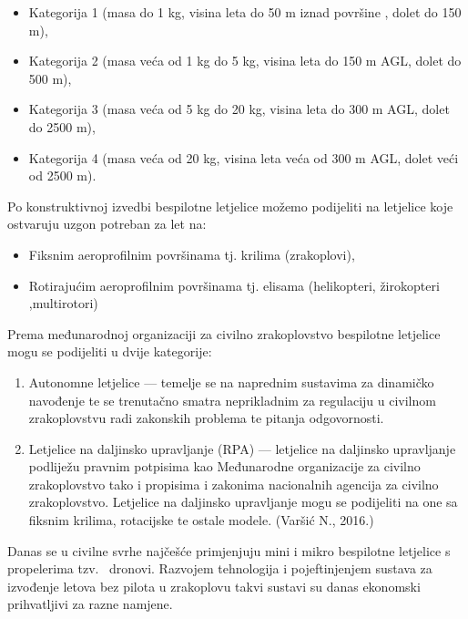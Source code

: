 \documentclass[times, utf8, diplomski]{fer}
\begin{document}
{\begin{itemize}
\item Kategorija  1  (masa  do  1  kg,  visina  leta do 50 m iznad površine , dolet do 150 m),
\item Kategorija 2 (masa veća od 1 kg do 5 kg, visina leta do 150 m AGL, dolet do 500 m),
\item Kategorija 3 (masa veća od 5 kg do 20 kg, visina leta do 300 m AGL, dolet do 2500 m),
\item Kategorija 4 (masa veća od 20 kg, visina leta veća od 300 m AGL, dolet veći od 2500 m).
\end{itemize}
Po konstruktivnoj izvedbi bespilotne letjelice možemo podijeliti na letjelice koje ostvaruju uzgon potreban za let na:\begin{itemize}
\item Fiksnim aeroprofilnim površinama tj. krilima (zrakoplovi),
\item Rotirajućim  aeroprofilnim  površinama  tj.  elisama  (helikopteri,  žirokopteri ,multirotori) 
\end{itemize}
Prema  međunarodnoj  organizaciji  za civilno  zrakoplovstvo   bespilotne letjelice mogu se podijeliti u dvije kategorije:\begin{enumerate}
\item Autonomne letjelice --- temelje se na naprednim sustavima za dinamičko navođenje te se trenutačno smatra neprikladnim za regulaciju u civilnom zrakoplovstvu radi zakonskih problema te pitanja odgovornosti.
\item Letjelice na daljinsko upravljanje (RPA) --- letjelice na daljinsko upravljanje podliježu pravnim  potpisima  kao  Međunarodne organizacije  za  civilno  zrakoplovstvo  tako  i propisima  i  zakonima  nacionalnih  agencija  za  civilno  zrakoplovstvo.  Letjelice  na daljinsko upravljanje mogu se podijeliti na one sa fiksnim krilima, rotacijske te ostale modele. (Varšić N., 2016.)
\end{enumerate}
Danas  se  u  civilne  svrhe  najčešće  primjenjuju  mini  i  mikro bespilotne  letjelice  s propelerima  tzv.  ~dronovi.  Razvojem  tehnologija  i  pojeftinjenjem  sustava  za  izvođenje letova  bez  pilota  u  zrakoplovu  takvi  sustavi  su  danas  ekonomski  prihvatljivi  za  razne namjene. 

}
\end{document}
